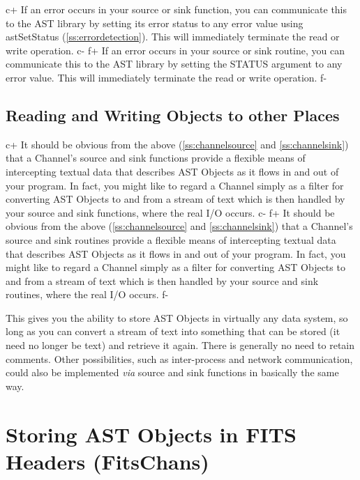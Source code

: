 \documentclass[twoside,11pt]{article}
\newcommand{\secref}[1]{\S\ref{#1}}
\renewcommand{\secref}[1]{\ref{#1}}
\begin{document}
c+
If an error occurs in your source or sink function, you can
communicate this to the AST library by setting its error status to any
error value using astSetStatus (\secref{ss:errordetection}). This will
immediately terminate the read or write operation.
c-
f+
If an error occurs in your source or sink routine, you can communicate
this to the AST library by setting the STATUS argument to any error
value. This will immediately terminate the read or write operation.
f-

\subsection{\label{ss:otherplaces}Reading and Writing Objects to other Places}

c+
It should be obvious from the above (\secref{ss:channelsource} and
\secref{ss:channelsink}) that a Channel's source and sink functions
provide a flexible means of intercepting textual data that describes
AST Objects as it flows in and out of your program. In fact, you might
like to regard a Channel simply as a filter for converting AST Objects
to and from a stream of text which is then handled by your source and
sink functions, where the real I/O occurs.
c-
f+
It should be obvious from the above (\secref{ss:channelsource} and
\secref{ss:channelsink}) that a Channel's source and sink routines
provide a flexible means of intercepting textual data that describes
AST Objects as it flows in and out of your program. In fact, you might
like to regard a Channel simply as a filter for converting AST Objects
to and from a stream of text which is then handled by your source and
sink routines, where the real I/O occurs.
f-

This gives you the ability to store AST Objects in virtually any data
system, so long as you can convert a stream of text into something
that can be stored (it need no longer be text) and retrieve it
again. There is generally no need to retain comments.  Other
possibilities, such as inter-process and network communication, could
also be implemented {\em{via}} source and sink functions in basically
the same way.

\cleardoublepage
\section{\label{ss:nativefits}Storing AST Objects in FITS Headers (FitsChans)}
\end{document}
